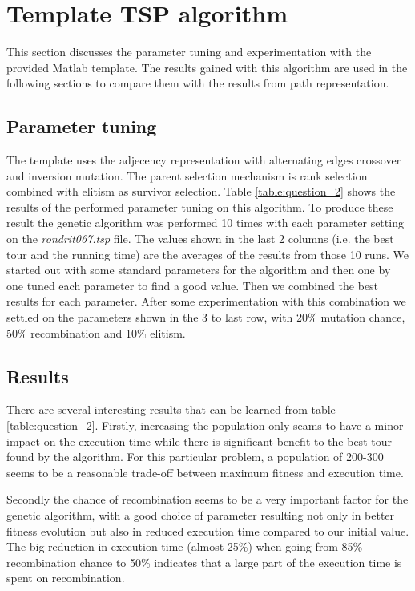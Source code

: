 

\section{Template TSP algorithm}

This section discusses the parameter tuning and experimentation with the provided Matlab template. The results gained with this algorithm are used in the following sections to compare them with the results from path representation.

\subsection{Parameter tuning}
 The template uses the adjecency representation with alternating edges crossover and inversion mutation. The parent selection mechanism is rank selection combined with elitism as survivor selection. Table \ref{table:question_2} shows the results of the performed parameter tuning on this algorithm. To produce these result the genetic algorithm was performed 10 times with each parameter setting on the \emph{rondrit067.tsp} file. The values shown in the last 2 columns (i.e. the best tour and the running time) are the averages of the results from those 10 runs. We started out with some standard parameters for the algorithm and then one by one tuned each parameter to find a good value. Then we combined the best results for each parameter. After some experimentation with this combination we settled on the parameters shown in the 3 to last row, with 20\% mutation chance, 50\% recombination and 10\% elitism.
 
\subsection{Results}
There are several interesting results that can be learned from table \ref{table:question_2}. Firstly, increasing the population only seams to have a minor impact on the execution time while there is significant benefit to the best tour found by the algorithm. For this particular problem, a population of 200-300 seems to be a reasonable trade-off between maximum fitness and execution time.

Secondly the chance of recombination seems to be a very important factor for the genetic algorithm, with a good choice of parameter resulting not only in better fitness evolution but also in reduced execution time compared to our initial value. The big reduction in execution time (almost 25\%) when going from 85\% recombination chance to 50\% indicates that a large part of the execution time is spent on recombination.

